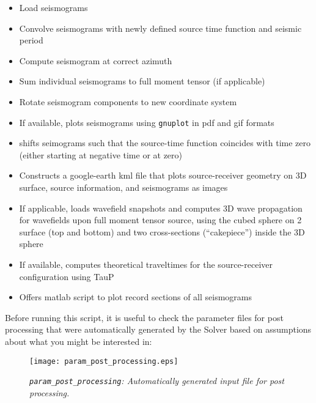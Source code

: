 \documentclass[11pt,letter,fleqn,english,notitlepage]{article}
\begin{document}
\begin{itemize}
    \item Load seismograms
    \item Convolve seismograms with newly defined source time function and
    seismic period

    \item Compute seismogram at correct azimuth
    \item Sum individual seismograms to full moment tensor (if applicable)
    \item Rotate seismogram components to new coordinate system
    \item If available, plots seismograms using {\tt gnuplot} in pdf and gif
    formats

    \item shifts seimograms such that the source-time function coincides with
    time zero (either starting at negative time or at zero)

    \item Constructs a google-earth kml file that plots source-receiver
    geometry on 3D surface, source information, and seismograms as images

    \item If applicable, loads wavefield snapshots and computes 3D wave
    propagation for wavefields upon full moment tensor source, using the cubed
    sphere on 2 surface (top and bottom) and two cross-sections (``cakepiece'')
    inside the 3D sphere

    \item If available, computes theoretical traveltimes for the
    source-receiver configuration using TauP

    \item Offers matlab script to plot record sections of all seismograms
\end{itemize}

\noindent Before running this script, it is useful to check the parameter files
for post processing that were automatically generated by the Solver based on
assumptions about what you might be interested in:\\

\begin{figure*}[htb]
    \begin{center}
        \texttt{[image: param\_post\_processing.eps]}
        \caption{\textit{{\tt param\_post\_processing}: Automatically generated input file for post processing.}}
    \end{center}
\end{figure*}
\end{document}
